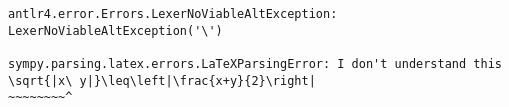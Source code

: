 \begin{verbatim}
antlr4.error.Errors.LexerNoViableAltException: LexerNoViableAltException('\')

sympy.parsing.latex.errors.LaTeXParsingError: I don't understand this
\sqrt{|x\ y|}\leq\left|\frac{x+y}{2}\right|
~~~~~~~~^
\end{verbatim}